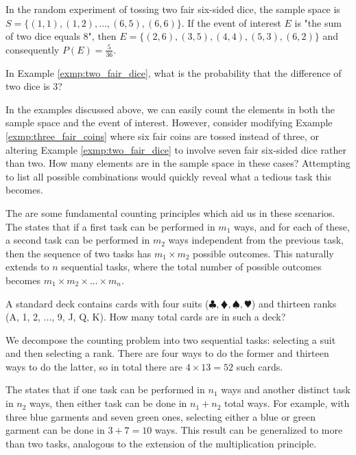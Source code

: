 \begin{exmp}\label{exmp:two_fair_dice}
	In the random experiment of tossing two fair six-sided dice, the sample space is
	\( S = \{ (1, 1), (1, 2), \ldots, (6, 5), (6, 6) \} \).
	If the event of interest \( E \) is "the sum of two dice equals 8",
	then \( E = \{ (2, 6), (3, 5), (4, 4), (5, 3), (6, 2) \} \) and consequently \( P(E) = \frac{5}{36} \).
\end{exmp}

\begin{ex}
	In Example \autoref{exmp:two_fair_dice}, what is the probability that the difference of two dice is 3?
\end{ex}

In the examples discussed above, we can easily count the elements in both the sample space and the event of interest.
However, consider modifying Example \autoref{exmp:three_fair_coins} where six fair coins are tossed instead of three,
or altering Example \autoref{exmp:two_fair_dice} to involve seven fair six-sided dice rather than two.
How many elements are in the sample space in these cases?
Attempting to list all possible combinations would quickly reveal what a tedious task this becomes.

The are some fundamental counting principles which aid us in these scenarios.
The  states that if a first task can be performed in \( m_1 \) ways,
and for each of these, a second task can be performed in \( m_2 \) ways independent from the previous task,
then the sequence of two tasks has \( m_1 \times m_2 \) possible outcomes.
This naturally extends to \( n \) sequential tasks,
where the total number of possible outcomes becomes \( m_1 \times m_2 \times \ldots \times m_n \).

\begin{exmp}
	A standard deck contains cards with four suits (\( \clubsuit, \vardiamondsuit, \spadesuit, \varheartsuit \)) and thirteen ranks (A, 1, 2, ..., 9, J, Q, K).
	How many total cards are in such a deck?
\end{exmp}
\begin{solution}
	We decompose the counting problem into two sequential tasks:
	selecting a suit and then selecting a rank.
	There are four ways to do the former and thirteen ways to do the latter, so in total there are \( 4 \times 13 = 52 \) such cards.
\end{solution}

The  states that if one task can be performed in \( n_1 \) ways and another distinct task in \( n_2 \) ways,
then either task can be done in \( n_1 + n_2 \) total ways.
For example, with three blue garments and seven green ones,
selecting either a blue or green garment can be done in \( 3 + 7 = 10 \) ways.
This result can be generalized to more than two tasks, analogous to the extension of the multiplication principle.

